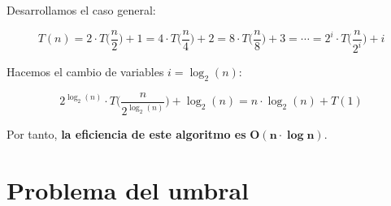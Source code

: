 Desarrollamos el caso general:

\[T(n)=2\cdot T\Big(\frac{n}{2}\Big)+1=4\cdot T\Big(\frac{n}{4}\Big)+2=8\cdot T\Big(\frac{n}{8}\Big)+3=\cdots=2^i\cdot T\Big(\frac{n}{2^i}\Big)+i\]

Hacemos el cambio de variables $i=\log_2(n)$:

\[2^{\log_2(n)}\cdot T\Big(\frac{n}{2^{\log_2(n)}}\Big)+\log_2(n)=n\cdot\log_2(n)+T(1)\]

Por tanto, \textbf{la eficiencia de este algoritmo es} $\boldsymbol{O(n\cdot\log n)}$.

\section{Problema del umbral}
